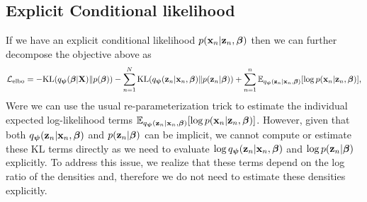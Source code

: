\documentclass[12pt,a4page]{article}
\begin{document}
	\subsection{Explicit Conditional likelihood}
	If we have an explicit conditional likelihood $\condlike{n}$ then we can further decompose the objective above as 
	\begin{align}
		\elbo = 	 - \kl{\varhyper}{\priorhyper}  -  \sum_{n=1}^N \kl{\varcond{n}}{\prior{n}} +  \sum_{n=1}^n \expectation{\varcond{n}}{\log \condlike{n}} \text{,}
	\end{align}
	Were we can use the usual re-parameterization trick to estimate the individual expected log-likelihood terms $\expectation{\varcond{n}}{\log \condlike{n}}$.
	However, given that both $\varcond{n}$ and $\prior{n}$ can be implicit, we cannot compute or estimate these KL terms directly as we need to evaluate 
	$\log \varcond{n}$  and $\log \prior{n}$ explicitly. To address this issue, we realize that these terms depend on the log ratio of the densities and, therefore we do not 
	need to estimate these densities explicitly. 
\end{document}
